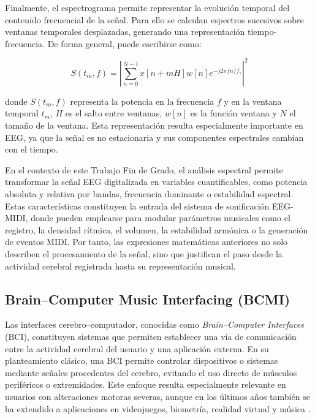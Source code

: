 \documentclass[../main.tex]{subfiles}
\begin{document}
Finalmente, el espectrograma permite representar la evolución temporal del contenido frecuencial de la señal. Para ello se calculan espectros sucesivos sobre ventanas temporales desplazadas, generando una representación tiempo-frecuencia. De forma general, puede escribirse como:

\begin{equation}
    S(t_m,f)
    =
    \left|
    \sum_{n=0}^{N-1}
    x[n+mH]w[n]e^{-j2\pi fn/f_s}
    \right|^2
    \label{eq:spectrogram}
\end{equation}

donde \(S(t_m,f)\) representa la potencia en la frecuencia \(f\) y en la ventana temporal \(t_m\), \(H\) es el salto entre ventanas, \(w[n]\) es la función ventana y \(N\) el tamaño de la ventana. Esta representación resulta especialmente importante en EEG, ya que la señal es no estacionaria y sus componentes espectrales cambian con el tiempo.

En el contexto de este Trabajo Fin de Grado, el análisis espectral permite transformar la señal EEG digitalizada en variables cuantificables, como potencia absoluta y relativa por bandas, frecuencia dominante o estabilidad espectral. Estas características constituyen la entrada del sistema de sonificación EEG-MIDI, donde pueden emplearse para modular parámetros musicales como el registro, la densidad rítmica, el volumen, la estabilidad armónica o la generación de eventos MIDI. Por tanto, las expresiones matemáticas anteriores no solo describen el procesamiento de la señal, sino que justifican el paso desde la actividad cerebral registrada hasta su representación musical.

\subsection{Brain--Computer Music Interfacing (BCMI)}

Las interfaces cerebro--computador, conocidas como \textit{Brain--Computer Interfaces} (BCI), constituyen sistemas que permiten establecer una vía de comunicación entre la actividad cerebral del usuario y una aplicación externa. En su planteamiento clásico, una BCI permite controlar dispositivos o sistemas mediante señales procedentes del cerebro, evitando el uso directo de músculos periféricos o extremidades. Este enfoque resulta especialmente relevante en usuarios con alteraciones motoras severas, aunque en los últimos años también se ha extendido a aplicaciones en videojuegos, biometría, realidad virtual y música \cite{Palaniappan2014}.
\end{document}
